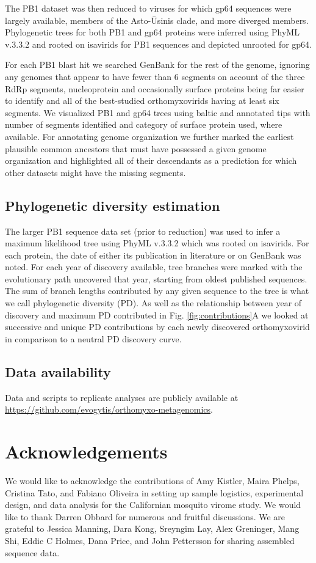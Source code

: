 \documentclass[11pt,twocolumn]{article}
\begin{document}
The PB1 dataset was then reduced to viruses for which gp64 sequences were largely available, members of the Asto-\={U}sinis clade, and more diverged members.
Phylogenetic trees for both PB1 and gp64 proteins were inferred using PhyML v.3.3.2 and rooted on isavirids for PB1 sequences and depicted unrooted for gp64.

For each PB1 blast hit we searched GenBank for the rest of the genome, ignoring any genomes that appear to have fewer than 6 segments on account of the three RdRp segments, nucleoprotein and occasionally surface proteins being far easier to identify and all of the best-studied orthomyxovirids having at least six segments.
We visualized PB1 and gp64 trees using baltic and annotated tips with number of segments identified and category of surface protein used, where available.
For annotating genome organization we further marked the earliest plausible common ancestors that must have possessed a given genome organization and highlighted all of their descendants as a prediction for which other datasets might have the missing segments.


\subsection{Phylogenetic diversity estimation}

The larger PB1 sequence data set (prior to reduction) was used to infer a maximum likelihood tree using PhyML v.3.3.2 which was rooted on isavirids.
For each protein, the date of either its publication in literature or on GenBank was noted.
For each year of discovery available, tree branches were marked with the evolutionary path uncovered that year, starting from oldest published sequences.
The sum of branch lengths contributed by any given sequence to the tree is what we call phylogenetic diversity (PD).
As well as the relationship between year of discovery and maximum PD contributed in Fig. \ref{fig:contributions}A we looked at successive and unique PD contributions by each newly discovered orthomyxovirid in comparison to a neutral PD discovery curve.

\subsection{Data availability}

Data and scripts to replicate analyses are publicly available at \url{https://github.com/evogytis/orthomyxo-metagenomics}.

\section{Acknowledgements}
We would like to acknowledge the contributions of Amy Kistler, Maira Phelps, Cristina Tato, and Fabiano Oliveira in setting up sample logistics, experimental design, and data analysis for the Californian mosquito virome study.
We would like to thank Darren Obbard for numerous and fruitful discussions.
We are grateful to Jessica Manning, Dara Kong, Sreyngim Lay, Alex Greninger, Mang Shi, Eddie C Holmes, Dana Price, and John Pettersson for sharing assembled sequence data.
\end{document}

